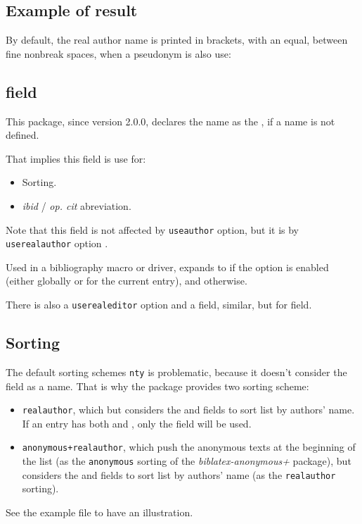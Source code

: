\documentclass{ltxdockit}[2011/03/25]
\begin{document}
\subsection{Example of result}

By default, the real author name is printed in brackets, with an equal, between fine nonbreak spaces,  when a pseudonym is also use:
\begin{quotation}
\cite{LeClerc1686}

\cite{Simon1686}
\end{quotation}

\subsection{ field}\label{field:label} 

This package, since version 2.0.0, declares  the  name as the , if a  name is not defined.

That implies this field is use for:
\begin{itemize}
  \item Sorting.
  \item \emph{ibid} / \emph{op. cit} abreviation.
\end{itemize}

Note that this field is not affected by \verb+useauthor+ option, but it is by \verb+userealauthor+ option .

Used in a bibliography macro or driver,  expands to  if the  option is enabled (either globally or for the current entry), and  otherwise.

There is also a \verb+userealeditor+ option and a  field, similar, but for  field.

\subsection{Sorting}\label{sorting}

The default sorting schemes \verb+nty+ is problematic, because it doesn't consider the  field  as a name. That is why the package provides two sorting scheme:

\begin{itemize}
   \item  \verb|realauthor|, which  but considers the  and  fields to sort list by authors' name. If an entry has both  and , only the  field will be used.
  \item  \verb|anonymous+realauthor|, which push the anonymous texts at the beginning of the list (as the \verb+anonymous+ sorting of the \emph{biblatex-anonymous+} package), but considers the  and  fields to sort list by authors' name (as the \verb+realauthor+ sorting).
\end{itemize} 
  See the example file to have an illustration.
  
\end{document}
